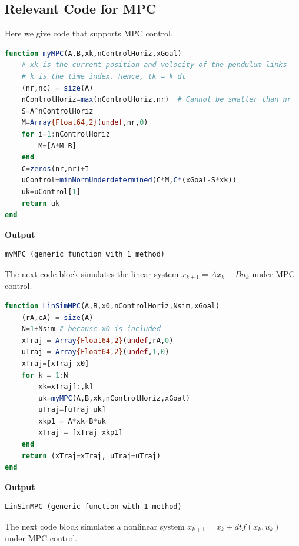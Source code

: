 \subsection{Relevant Code for MPC}
 
Here we give code that supports MPC control. 

\vspace*{.2cm}


\begin{lstlisting}[language=Julia,style=mystyle]
function myMPC(A,B,xk,nControlHoriz,xGoal)
    # xk is the current position and velocity of the pendulum links
    # k is the time index. Hence, tk = k dt
    (nr,nc) = size(A)
    nControlHoriz=max(nControlHoriz,nr)  # Cannot be smaller than nr
    S=A^nControlHoriz
    M=Array{Float64,2}(undef,nr,0)
    for i=1:nControlHoriz
        M=[A*M B]
    end
    C=zeros(nr,nr)+I
    uControl=minNormUnderdetermined(C*M,C*(xGoal-S*xk))
    uk=uControl[1]
    return uk
end
\end{lstlisting}
\textbf{Output} 
\begin{verbatim}
myMPC (generic function with 1 method)
\end{verbatim}

The next code block simulates the linear system $x_{k+1} = A x_k + B u_k$ under MPC control.\\

\begin{lstlisting}[language=Julia,style=mystyle]
function LinSimMPC(A,B,x0,nControlHoriz,Nsim,xGoal)
    (rA,cA) = size(A)
    N=1+Nsim # because x0 is included
    xTraj = Array{Float64,2}(undef,rA,0)
    uTraj = Array{Float64,2}(undef,1,0)
    xTraj=[xTraj x0]
    for k = 1:N
        xk=xTraj[:,k]
        uk=myMPC(A,B,xk,nControlHoriz,xGoal)
        uTraj=[uTraj uk]
        xkp1 = A*xk+B*uk
        xTraj = [xTraj xkp1]          
    end
    return (xTraj=xTraj, uTraj=uTraj)
end
\end{lstlisting}
\textbf{Output} 
\begin{verbatim}
LinSimMPC (generic function with 1 method)
\end{verbatim}

The next code block simulates a nonlinear system $x_{k+1} = x_k + dt f(x_k, u_k)$ under MPC control.\\

